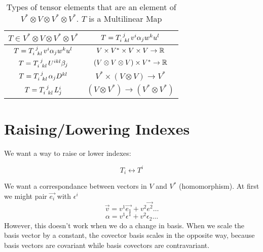 \documentclass{report}
\begin{document}
\begin{table}[htpb]
	\centering
	\caption{Types of tensor elements that are an element of $V^* \otimes V \otimes V^* \otimes V^*$. $T$ is a Multilinear Map}
	\label{tab:v*tpvtpv*tpv*}
	\begin{tabular}{|cc|}
		\hline
		$T \in V^* \otimes V \otimes V^* \otimes V^*$ & $T = T\indices{_i^j_{kl}} v^i\alpha_j w^k u^l $ \\
		\hline
		$T = T\indices{_i^j_{kl}} v^i\alpha_j w^k u^l $ & $V \times V^* \times V \times V \to \R$\\
		$T = T\indices{_i^j_{kl}} U^{ikl}\beta_j $ & $(V \otimes V \otimes V) \times V^* \to \R$\\
		$T= T\indices{_i^j_{kl}} \alpha_j D^{kl}$ & $V^* \times \left( V \otimes V \right) \to V^*$  \\
		$T= T\indices{_i^j_{kl}}L_j^i$ & $\left( V \otimes V^* \right) \to \left(V^* \otimes V^*  \right)$  \\
		\hline
	\end{tabular}
\end{table}



\chapter{Raising/Lowering Indexes}
We want a way to raise or lower indexes:

$$ T_i \leftrightarrow T^i $$ 

We want a correspondance between vectors in $V$ and $V^*$ (homomorphism). At first we might pair $\vec{e_i}$ with $\epsilon^i$
$$ \vec{v} = v^1 \vec{e_1} + v^2 \vec{e^2} \ldots $$ 
$$ \alpha = v^1 \epsilon^1 + v^2 \epsilon_2 \ldots $$ 
However, this doesn't work when we do a change in basis. When we scale the basis vector by a constant, the covector basis scales in the opposite way, because basis vectors are covariant while basis covectors are contravariant.
\end{document}
